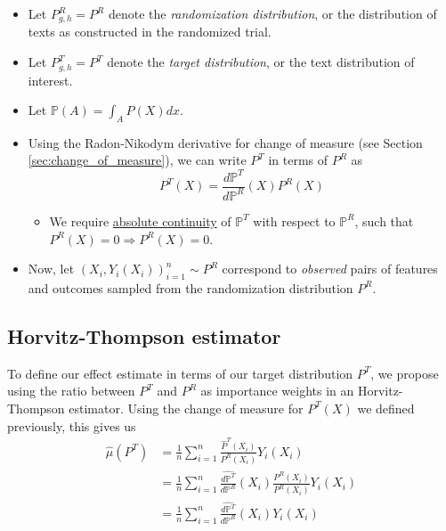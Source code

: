 \documentclass{article}
\newcommand{\vl}[1]{\textcolor{orange}{[VL: #1]}}
\begin{document}
\begin{itemize}
    \item Let $P^R_{g,h} = P^R$ denote the \textit{randomization distribution}, or the distribution of texts as constructed in the randomized trial.
    \item Let $P^T_{g,h} = P^T$ denote the \textit{target distribution}, or the text distribution of interest.
    \item Let $\mathbb{P}(A) = \int_A P(X) dx$.
    \item Using the Radon-Nikodym derivative for change of measure (see Section \ref{sec:change_of_measure}), we can write $P^T$ in terms of $P^R$ as
    \begin{equation*}
        P^T(X) = \frac{d\mathbb{P}^T}{d\mathbb{P}^R}(X)P^R(X)
    \end{equation*}
    \begin{itemize}
        \item We require \href{https://en.wikipedia.org/wiki/Absolute_continuity#Absolute_continuity_of_measures}{absolute continuity} of $\mathbb{P}^T$ with respect to  $\mathbb{P}^R$, such that $P^R(X) = 0 \Rightarrow P^R(X) = 0$.
    \end{itemize}
    \item Now, let $(X_i,Y_i(X_i))_{i=1}^n \sim P^R$ correspond to \textit{observed} pairs of features and outcomes sampled from the randomization distribution $P^R$.
\end{itemize}

\subsection{Horvitz-Thompson estimator}

To define our effect estimate in terms of our target distribution $P^T$, we propose using the ratio between $P^T$ and $P^R$ as importance weights in an Horvitz-Thompson estimator. Using the change of measure for $P^T(X)$ we defined previously, this gives us 
\begin{align*}
    \hat{\mu}(P^T) &= \frac{1}{n} \sum_{i=1}^n \frac{\hat{P}^T(X_i)}{P^R(X_i)}Y_i(X_i) \\
    &= \frac{1}{n} \sum_{i=1}^n \frac{\hat{d \mathbb{P}^T}}{d \mathbb{P}^R}(X_i)\frac{P^R(X_i)}{P^R(X_i)} Y_i(X_i) \\
    &=\boxed{\frac{1}{n} \sum_{i=1}^n \frac{\hat{d \mathbb{P}^T}}{d \mathbb{P}^R}(X_i)Y_i(X_i)}
\end{align*}
\end{document}

